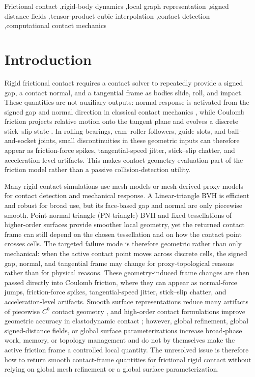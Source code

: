 \documentclass[preprint,12pt]{elsarticle}
\begin{document}
\begin{frontmatter}
\begin{keyword}
Frictional contact \sep rigid-body dynamics \sep local graph representation \sep signed distance fields \sep tensor-product cubic interpolation \sep contact detection \sep computational contact mechanics
\end{keyword}

\end{frontmatter}

\section{Introduction}
\label{sec:introduction}

Rigid frictional contact requires a contact solver to repeatedly provide a signed gap, a contact normal, and a tangential frame as bodies slide, roll, and impact. These quantities are not auxiliary outputs: normal response is activated from the signed gap and normal direction in classical contact mechanics \cite{johnson1985,laursen2002}, while Coulomb friction projects relative motion onto the tangent plane and evolves a discrete stick--slip state \cite{kikuchi1988,wriggers2006}. In rolling bearings, cam--roller followers, guide slots, and ball-and-socket joints, small discontinuities in these geometric inputs can therefore appear as friction-force spikes, tangential-speed jitter, stick--slip chatter, and acceleration-level artifacts. This makes contact-geometry evaluation part of the friction model rather than a passive collision-detection utility.

Many rigid-contact simulations use mesh models or mesh-derived proxy models for contact detection and mechanical response. A Linear-triangle BVH is efficient and robust for broad use, but its face-based gap and normal are only piecewise smooth. Point-normal triangle (PN-triangle) BVH and fixed tessellations of higher-order surfaces provide smoother local geometry, yet the returned contact frame can still depend on the chosen tessellation and on how the contact point crosses cells. The targeted failure mode is therefore geometric rather than only mechanical: when the active contact point moves across discrete cells, the signed gap, normal, and tangential frame may change for proxy-topological reasons rather than for physical reasons. These geometry-induced frame changes are then passed directly into Coulomb friction, where they can appear as normal-force jumps, friction-force spikes, tangential-speed jitter, stick--slip chatter, and acceleration-level artifacts. Smooth surface representations reduce many artifacts of piecewise $C^0$ contact geometry \cite{du2024smooth}, and high-order contact formulations improve geometric accuracy in elastodynamic contact \cite{ferguson2023highorder}; however, global refinement, global signed-distance fields, or global surface parameterizations increase broad-phase work, memory, or topology management and do not by themselves make the active friction frame a controlled local quantity. The unresolved issue is therefore how to return smooth contact-frame quantities for frictional rigid contact without relying on global mesh refinement or a global surface parameterization.
\end{document}
